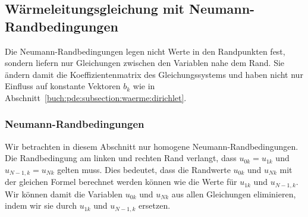 \subsection{Wärmeleitungsgleichung mit Neumann-Randbedingungen
\label{buch:pde:subsection:waerme:neumann}}
Die Neumann-Randbedingungen legen nicht Werte in den Randpunkten fest,
sondern liefern nur Gleichungen zwischen den Variablen nahe dem Rand.
Sie ändern damit die Koeffizientenmatrix des Gleichungssystems und haben
nicht nur Einfluss auf konstante Vektoren $b_k$ wie in
Abschnitt~\ref{buch:pde:subsection:waerme:dirichlet}.

\subsubsection{Neumann-Randbedingungen}
Wir betrachten in diesem Abschnitt nur homogene Neumann-Randbedingungen.
Die Randbedingung am linken und rechten Rand verlangt, dass $u_{0k}=u_{1k}$
und $u_{N-1,k}=u_{Nk}$ gelten muss.
Dies bedeutet, dass die Randwerte $u_{0k}$ und $u_{Nk}$ mit der
gleichen Formel berechnet werden können wie die Werte für $u_{1k}$ und
$u_{N-1,k}$.
Wir können damit die Variablen $u_{0k}$ und $u_{Nk}$ aus allen
Gleichungen eliminieren, indem wir sie durch $u_{1k}$ und $u_{N-1,k}$ 
ersetzen.


